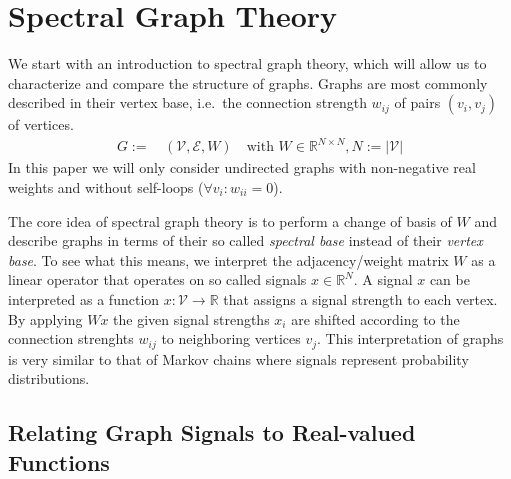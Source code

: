 \section{Spectral Graph Theory}%
\label{sec:sgt}

We start with an introduction to spectral graph theory, which will allow us to characterize and compare the structure of graphs.
Graphs are most commonly described in their vertex base, i.e.\  the connection strength $w_{i j}$ of pairs $(v_i, v_j)$ of vertices.
\begin{align}
	G :=&\, (\mathcal{V}, \mathcal{E}, W)\quad\text{with } W \in \mathbb{R}^{N \times N}, N := |\mathcal{V}|
\end{align}
In this paper we will only consider undirected graphs with non-negative real weights and without self-loops ($\forall v_i: w_{i i} = 0$).

The core idea of spectral graph theory is to perform a change of basis of $W$ and describe graphs in terms of their so called \textit{spectral base} instead of their \textit{vertex base}.
To see what this means, we interpret the adjacency/weight matrix $W$ as a linear operator that operates on so called signals $x \in \mathbb{R}^N$.
A signal $x$ can be interpreted as a function $x: \mathcal{V} \to \mathbb{R}$ that assigns a signal strength to each vertex.
By applying $Wx$ the given signal strengths $x_i$ are shifted according to the connection strenghts $w_{i j}$ to neighboring vertices $v_j$.
This interpretation of graphs is very similar to that of Markov chains where signals represent probability distributions.

\subsection{Relating Graph Signals to Real-valued Functions}%
\label{sec:sgt:real}

